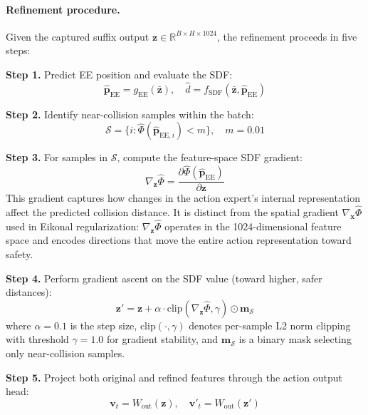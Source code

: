 \paragraph{Refinement procedure.} Given the captured suffix output $\mathbf{z} \in \mathbb{R}^{B \times H \times 1024}$, the refinement proceeds in five steps:

\textbf{Step 1.} Predict EE position and evaluate the SDF:
\begin{equation}
\hat{\mathbf{p}}_\mathrm{EE} = g_\mathrm{EE}(\bar{\mathbf{z}}), \quad \hat{d} = f_\mathrm{SDF}(\bar{\mathbf{z}}, \hat{\mathbf{p}}_\mathrm{EE})
\end{equation}

\textbf{Step 2.} Identify near-collision samples within the batch:
\begin{equation}\label{eq:collision_set}
\mathcal{S} = \{i : \hat{\Phi}(\hat{\mathbf{p}}_{\mathrm{EE},i}) < m\}, \quad m = 0.01
\end{equation}

\textbf{Step 3.} For samples in $\mathcal{S}$, compute the feature-space SDF gradient:
\begin{equation}\label{eq:feature_grad}
\nabla_{\mathbf{z}} \hat{\Phi} = \frac{\partial \hat{\Phi}(\hat{\mathbf{p}}_\mathrm{EE})}{\partial \mathbf{z}}
\end{equation}
This gradient captures how changes in the action expert's internal representation affect the predicted collision distance. It is distinct from the spatial gradient $\nabla_{\mathbf{x}} \hat{\Phi}$ used in Eikonal regularization: $\nabla_{\mathbf{z}} \hat{\Phi}$ operates in the 1024-dimensional feature space and encodes directions that move the entire action representation toward safety.

\textbf{Step 4.} Perform gradient ascent on the SDF value (toward higher, safer distances):
\begin{equation}\label{eq:gradient_ascent}
\mathbf{z}' = \mathbf{z} + \alpha \cdot \mathrm{clip}(\nabla_{\mathbf{z}} \hat{\Phi}, \gamma) \odot \mathbf{m}_\mathcal{S}
\end{equation}
where $\alpha = 0.1$ is the step size, $\mathrm{clip}(\cdot, \gamma)$ denotes per-sample L2 norm clipping with threshold $\gamma = 1.0$ for gradient stability, and $\mathbf{m}_\mathcal{S}$ is a binary mask selecting only near-collision samples.

\textbf{Step 5.} Project both original and refined features through the action output head:
\begin{equation}\label{eq:projection}
\mathbf{v}_t = W_\mathrm{out}(\mathbf{z}), \quad \mathbf{v}'_t = W_\mathrm{out}(\mathbf{z}')
\end{equation}

